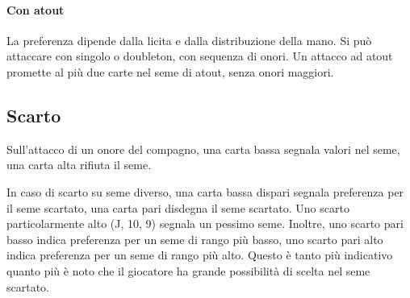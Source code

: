 \documentclass[a4paper,10pt]{article}
\begin{document}
\paragraph{Con atout} La preferenza dipende dalla licita e dalla distribuzione della mano. Si può attaccare con singolo o doubleton, con sequenza di onori. Un attacco ad atout promette al più due carte nel seme di atout, senza onori maggiori.

\subsection{Scarto}

Sull'attacco di un onore del compagno, una carta bassa segnala valori nel seme, una carta alta rifiuta il seme.

In caso di scarto su seme diverso, una carta bassa dispari segnala preferenza per il seme scartato, una carta pari disdegna il seme scartato. Uno scarto particolarmente alto (J, 10, 9) segnala un pessimo seme. Inoltre, uno scarto pari basso indica preferenza per un seme di rango più basso, uno scarto pari alto indica preferenza per un seme di rango più alto. Questo è tanto più indicativo quanto più è noto che il giocatore ha grande possibilità di scelta nel seme scartato.
\end{document}

